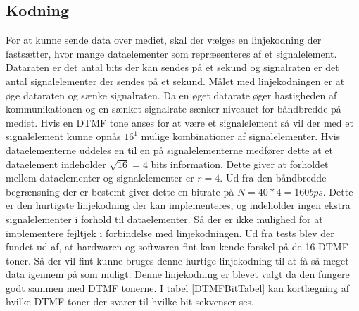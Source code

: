\subsection{Kodning}
For at kunne sende data over mediet, skal der vælges en linjekodning der fastsætter, hvor mange dataelementer som repræsenteres af et signalelement. Dataraten er det antal bits der kan sendes på et sekund og signalraten er det antal signalelementer der sendes på et sekund. Målet med linjekodningen er at øge dataraten og sænke signalraten. Da en øget datarate øger hastigheden af kommunikationen og en sænket signalrate sænker niveauet for båndbredde på mediet. Hvis en DTMF tone anses for at være et signalelement så vil der med et signalelement kunne opnås $16^{1}$ mulige kombinationer af signalelementer. Hvis dataelementerne uddeles en til en på signalelementerne medfører dette at et dataelement indeholder $\sqrt{16}=4$ bits information. Dette giver at forholdet mellem dataelementer og signalelementer er $r=4$. Ud fra den båndbredde-begrænsning der er bestemt giver dette en bitrate på $N=40*4=160bps$. Dette er den hurtigste linjekodning der kan implementeres, og indeholder ingen ekstra signalelementer i forhold til dataelementer. Så der er ikke mulighed for at implementere fejltjek i forbindelse med linjekodningen. Ud fra tests blev der fundet ud af, at hardwaren og softwaren fint kan kende forskel på de 16 DTMF toner. Så der vil fint kunne bruges denne hurtige linjekodning til at få så meget data igennem på som muligt. Denne linjekodning er blevet valgt da den fungere godt sammen med DTMF tonerne. I tabel \ref{DTMFBitTabel} kan kortlægning af hvilke DTMF toner der svarer til hvilke bit sekvenser ses.

